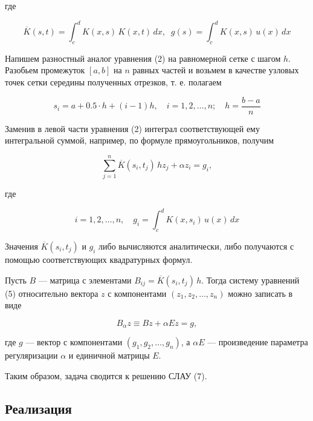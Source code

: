 где

\begin{equation}
  \overline{K}(s, t) = \int_c^d K(x, s) \, K(x, t) \, dx, \;\; g(s) = \int_c^d K(x, s) \, u(x) \, dx
\end{equation}

Напишем разностный аналог уравнения (2) на равномерной сетке с шагом $ h $. Разобьем промежуток $ [a, b] $ на $ n $ равных частей и возьмем в качестве узловых точек сетки середины полученных отрезков, т. е. полагаем

\begin{equation}
  s_i = a + 0.5 \cdot h + (i - 1) h, \quad i = 1, 2, \ldots, n; \quad h = \frac{b - a}{n}
\end{equation}

Заменив в левой части уравнения (2) интеграл соответствующей ему интегральной суммой, например, по формуле прямоугольников, получим

\begin{equation}
  \sum_{j=1}^n \overline{K}(s_i, t_j) \, h z_j + \alpha z_i = g_i,
\end{equation}

где

\begin{equation}
  i = 1, 2, \ldots, n, \quad g_i = \int_c^d K(x, s_i) \, u(x) \, dx
\end{equation}

Значения $ \overline{K}(s_i, t_j) $ и $ g_i $ либо вычисляются аналитически, либо получаются с помощью соответствующих квадратурных формул. \npar

Пусть $ B $ --- матрица с элементами $ B_{ij} = \overline{K}(s_i, t_j) \, h $. Тогда систему уравнений (5) относительно вектора $ z $ с компонентами $ (z_1, z_2, \ldots, z_n) $ можно записать в виде

\begin{equation}
  B_{\alpha} z \equiv Bz + \alpha E z = g,
\end{equation}

где $ g $ --- вектор с компонентами $ (g_1, g_2, \ldots, g_n) $, а $ \alpha E $ --- произведение параметра регуляризации $ \alpha $ и единичной матрицы $ E $. \npar

Таким образом, задача сводится к решению СЛАУ (7).

\subsection*{Реализация}

